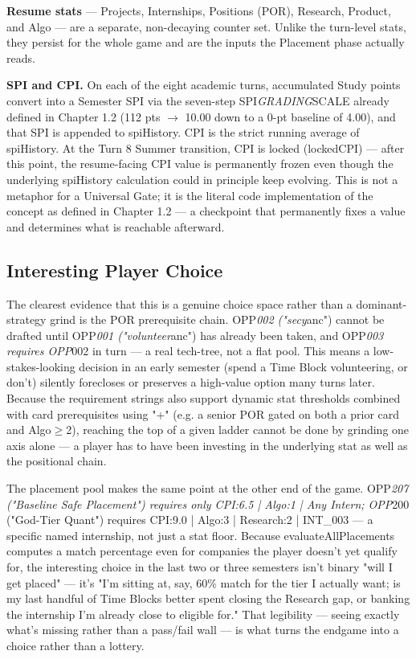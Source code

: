 \textbf{Resume stats} --- Projects, Internships, Positions (POR), Research, Product, and Algo --- are a separate, non-decaying counter set. Unlike the turn-level stats, they persist for the whole game and are the inputs the Placement phase actually reads.

\textbf{SPI and CPI.} On each of the eight academic turns, accumulated Study points convert into a Semester SPI via the seven-step SPI\emph{GRADING}SCALE already defined in Chapter 1.2 (112 pts $\rightarrow$ 10.00 down to a 0-pt baseline of 4.00), and that SPI is appended to spiHistory. CPI is the strict running average of spiHistory. At the Turn 8 Summer transition, CPI is locked (lockedCPI) --- after this point, the resume-facing CPI value is permanently frozen even though the underlying spiHistory calculation could in principle keep evolving. This is not a metaphor for a Universal Gate; it is the literal code implementation of the concept as defined in Chapter 1.2 --- a checkpoint that permanently fixes a value and determines what is reachable afterward.

\subsection{Interesting Player Choice}

The clearest evidence that this is a genuine choice space rather than a dominant-strategy grind is the POR prerequisite chain. OPP\emph{002 ("secy}anc") cannot be drafted until OPP\emph{001 ("volunteer}anc") has already been taken, and OPP\emph{003 requires OPP}002 in turn --- a real tech-tree, not a flat pool. This means a low-stakes-looking decision in an early semester (spend a Time Block volunteering, or don't) silently forecloses or preserves a high-value option many turns later. Because the requirement strings also support dynamic stat thresholds combined with card prerequisites using "+" (e.g. a senior POR gated on both a prior card and Algo$\geq$2), reaching the top of a given ladder cannot be done by grinding one axis alone --- a player has to have been investing in the underlying stat as well as the positional chain.

The placement pool makes the same point at the other end of the game. OPP\emph{207 ("Baseline Safe Placement") requires only CPI:6.5 | Algo:1 | Any Intern; OPP}200 ("God-Tier Quant") requires CPI:9.0 | Algo:3 | Research:2 | INT_003 --- a specific named internship, not just a stat floor. Because evaluateAllPlacements computes a match percentage even for companies the player doesn't yet qualify for, the interesting choice in the last two or three semesters isn't binary "will I get placed" --- it's "I'm sitting at, say, 60\% match for the tier I actually want; is my last handful of Time Blocks better spent closing the Research gap, or banking the internship I'm already close to eligible for." That legibility --- seeing exactly what's missing rather than a pass/fail wall --- is what turns the endgame into a choice rather than a lottery.

